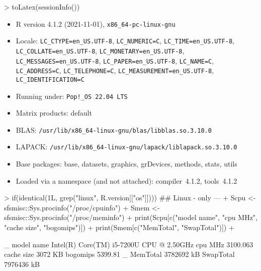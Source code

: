\documentclass{article}
\begin{document}
\begin{Schunk}
\begin{Sinput}
> toLatex(sessionInfo())
\end{Sinput}
\begin{itemize}\raggedright
  \item R version 4.1.2 (2021-11-01), \verb|x86_64-pc-linux-gnu|
  \item Locale: \verb|LC_CTYPE=en_US.UTF-8|, \verb|LC_NUMERIC=C|, \verb|LC_TIME=en_US.UTF-8|, \verb|LC_COLLATE=en_US.UTF-8|, \verb|LC_MONETARY=en_US.UTF-8|, \verb|LC_MESSAGES=en_US.UTF-8|, \verb|LC_PAPER=en_US.UTF-8|, \verb|LC_NAME=C|, \verb|LC_ADDRESS=C|, \verb|LC_TELEPHONE=C|, \verb|LC_MEASUREMENT=en_US.UTF-8|, \verb|LC_IDENTIFICATION=C|
  \item Running under: \verb|Pop!_OS 22.04 LTS|
  \item Matrix products: default
  \item BLAS:   \verb|/usr/lib/x86_64-linux-gnu/blas/libblas.so.3.10.0|
  \item LAPACK: \verb|/usr/lib/x86_64-linux-gnu/lapack/liblapack.so.3.10.0|
  \item Base packages: base, datasets, graphics, grDevices,
    methods, stats, utils
  \item Loaded via a namespace (and not attached): compiler~4.1.2,
    tools~4.1.2
\end{itemize}\end{Schunk}

\begin{Schunk}
\begin{Sinput}
> if(identical(1L, grep("linux", R.version[["os"]]))) { ## Linux - only ---
+  Scpu <- sfsmisc::Sys.procinfo("/proc/cpuinfo")
+  Smem <- sfsmisc::Sys.procinfo("/proc/meminfo")
+  print(Scpu[c("model name", "cpu MHz", "cache size", "bogomips")])
+  print(Smem[c("MemTotal", "SwapTotal")])
+ }
\end{Sinput}
\end{Schunk}
\begin{Schunk}
\begin{Soutput}
           _                                       
model name Intel(R) Core(TM) i5-7200U CPU @ 2.50GHz
cpu MHz    3100.063                                
cache size 3072 KB                                 
bogomips   5399.81                                 
          _         
MemTotal  3782692 kB
SwapTotal 7976436 kB
\end{Soutput}
\end{Schunk}


\end{document}
